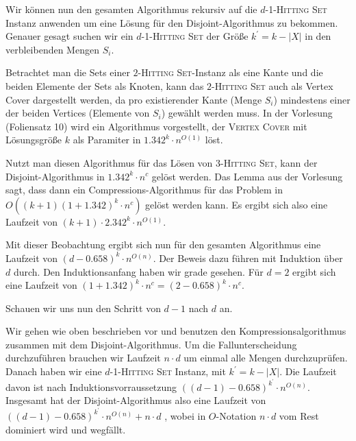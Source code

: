 Wir können nun den gesamten Algorithmus rekursiv auf die $d$-1-\textsc{Hitting Set} Instanz anwenden um eine Lösung für den Disjoint-Algorithmus zu bekommen. Genauer gesagt suchen wir ein $d$-1-\textsc{Hitting Set} der Größe $k^\prime = k - |X|$ in den verbleibenden Mengen $S_i$.

Betrachtet man die Sets einer $2$-\textsc{Hitting Set}-Instanz als eine Kante und die beiden Elemente der Sets als Knoten, kann das $2$-\textsc{Hitting Set} auch als Vertex Cover dargestellt werden, da pro existierender Kante (Menge $S_i$) mindestens einer der beiden Vertices (Elemente von $S_i$) gewählt werden muss. In der Vorlesung (Foliensatz 10) wird ein Algorithmus vorgestellt, der \textsc{Vertex Cover} mit Lösungsgröße $k$ als Paramiter in $1.342^k \cdot n^{O(1)}$ löst. 

Nutzt man diesen Algorithmus für das Lösen von $3$-\textsc{Hitting Set}, kann der Disjoint-Algorithmus in $1.342^k \cdot n^c$ gelöst werden. Das Lemma aus der Vorlesung sagt, dass dann ein Compressions-Algorithmus für das Problem in $O((k+1)(1+1.342)^k \cdot n^c)$ gelöst werden kann. Es ergibt sich also eine Laufzeit von $(k+1) \cdot 2.342^k \cdot n^{O(1)}$.

Mit dieser Beobachtung ergibt sich nun für den gesamten Algorithmus eine Laufzeit von $(d-0.658)^k \cdot n^{O(n)}$. Der Beweis dazu führen mit Induktion über $d$ durch.
Den Induktionsanfang haben wir grade gesehen. Für $d = 2$ ergibt sich eine Laufzeit von $(1+1.342)^k \cdot n^c = (2-0.658)^k \cdot n^c $.

Schauen wir uns nun den Schritt von $d-1$ nach $d$ an.

Wir gehen wie oben beschrieben vor und benutzen den Kompressionsalgorithmus zusammen mit dem Disjoint-Algorithmus.
Um die Fallunterscheidung durchzuführen brauchen wir Laufzeit $n \cdot d$ um einmal alle Mengen durchzuprüfen. Danach haben wir eine $d$-1-\textsc{Hitting Set} Instanz, mit $k^\prime = k - |X|$. Die Laufzeit davon ist nach Induktionsvorraussetzung $((d-1)-0.658)^{k^\prime} \cdot n^{O(n)}$. 
Insgesamt hat der Disjoint-Algorithmus also eine Laufzeit von $((d-1)-0.658)^{k^\prime} \cdot n^{O(n)} + n \cdot d$ , wobei in $O$-Notation $n \cdot d$ vom Rest dominiert wird und wegfällt.

